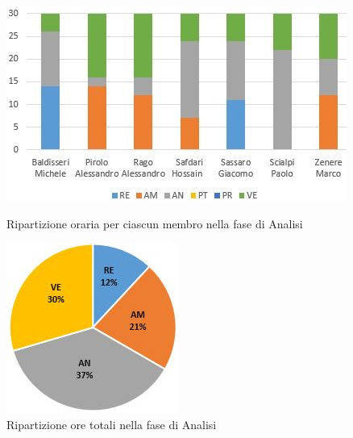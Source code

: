 \begin{figure}[!htb]
   \begin{minipage}{0.6\textwidth}
     \centering
     \includegraphics{Images/PO-Analisi}
     \caption{Ripartizione oraria per ciascun membro nella fase di Analisi}
   \end{minipage}\hspace{.1\textwidth}
   \begin{minipage}{0.3\textwidth}
     \centering
     \includegraphics[width=.9\textwidth]{Images/PE-Analisi}
     \captionsetup{width=.9\textwidth}
     \caption{Ripartizione ore totali nella fase di Analisi}
   \end{minipage}
\end{figure}

\newpage